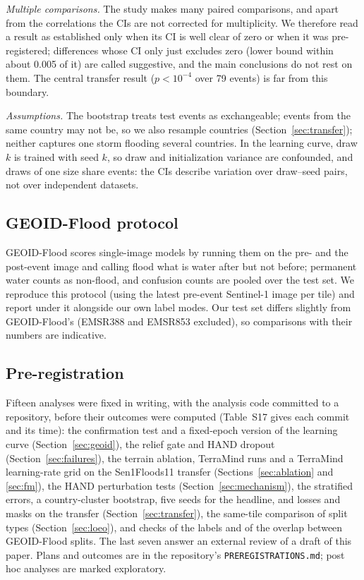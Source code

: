 \emph{Multiple comparisons.} The study makes many paired comparisons, and apart from the correlations the
CIs are not corrected for multiplicity. We therefore read a result as established only when its CI is
well clear of zero or when it was pre-registered; differences whose CI only just excludes zero (lower
bound within about 0.005 of it) are called suggestive, and the main conclusions do not rest on them. The
central transfer result ($p < 10^{-4}$ over 79 events) is far from this boundary.

\emph{Assumptions.} The bootstrap treats test events as exchangeable; events from the same country may not
be, so we also resample countries (Section~\ref{sec:transfer}); neither captures one storm flooding several
countries. In the learning curve, draw $k$ is trained
with seed $k$, so draw and initialization variance are confounded, and draws of one size share events: the
CIs describe variation over draw--seed pairs, not over independent datasets.

\subsection{GEOID-Flood protocol}
GEOID-Flood scores single-image models by running them on the pre- and the post-event image and calling
flood what is water after but not before; permanent water counts as non-flood, and confusion counts are
pooled over the test set. We reproduce this protocol (using the latest pre-event Sentinel-1 image per
tile) and report \iouf{} under it alongside our own label modes. Our test set differs slightly from
GEOID-Flood's (EMSR388 and EMSR853 excluded), so comparisons with their numbers are indicative.

\subsection{Pre-registration}
Fifteen analyses were fixed in writing, with the analysis code committed to a repository, before their
outcomes were computed (Table~S17 gives each commit and its time): the confirmation test and a
fixed-epoch version of the learning curve (Section~\ref{sec:geoid}), the relief gate and HAND dropout
(Section~\ref{sec:failures}), the terrain ablation, TerraMind runs and a TerraMind learning-rate grid on
the Sen1Floods11 transfer (Sections~\ref{sec:ablation} and \ref{sec:fm}), the HAND perturbation tests
(Section~\ref{sec:mechanism}), the stratified errors, a country-cluster bootstrap, five seeds for the
headline, and losses and masks on the transfer (Section~\ref{sec:transfer}), the same-tile comparison of split
types (Section~\ref{sec:loeo}), and checks of the labels and of the overlap between GEOID-Flood splits.
The last seven answer an external review of a draft of this paper. Plans and outcomes are in the
repository's \texttt{PREREGISTRATIONS.md}; post hoc analyses are marked exploratory.
